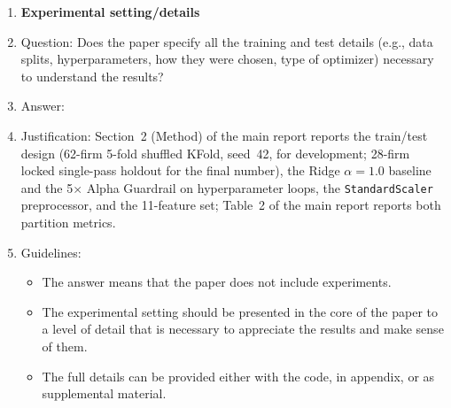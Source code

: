 \documentclass{article}
\begin{document}
\begin{enumerate}
\item {\bf Experimental setting/details}
    \item[] Question: Does the paper specify all the training and test details (e.g., data splits, hyperparameters, how they were chosen, type of optimizer) necessary to understand the results?
    \item[] Answer: \answerYes{}
    \item[] Justification: Section~2 (Method) of the main report reports the train/test design (62-firm 5-fold shuffled KFold, seed~42, for development; 28-firm locked single-pass holdout for the final number), the Ridge $\alpha{=}1.0$ baseline and the 5$\times$ Alpha Guardrail on hyperparameter loops, the \texttt{StandardScaler} preprocessor, and the 11-feature set; Table~2 of the main report reports both partition metrics.
    \item[] Guidelines:
    \begin{itemize}
        \item The answer \answerNA{} means that the paper does not include experiments.
        \item The experimental setting should be presented in the core of the paper to a level of detail that is necessary to appreciate the results and make sense of them.
        \item The full details can be provided either with the code, in appendix, or as supplemental material.
    \end{itemize}


\end{enumerate}
\end{document}

